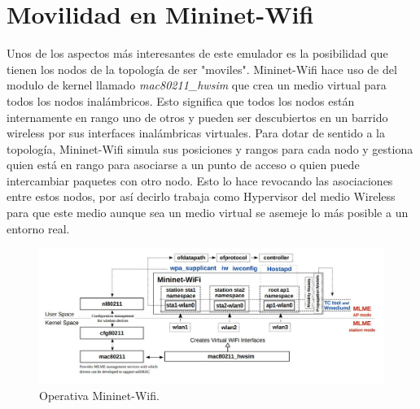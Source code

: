 \newpage
\section{Movilidad en Mininet-Wifi}
Unos de los aspectos más interesantes de este emulador es la posibilidad que tienen los nodos de la topología de ser "moviles". Mininet-Wifi hace uso de del modulo de kernel llamado \textit{mac80211\_hwsim} que crea un medio virtual para todos los nodos inalámbricos. Esto significa que todos los nodos están internamente en rango uno de otros y pueden ser descubiertos en un barrido wireless por sus interfaces inalámbricas virtuales. \newline
\newline
Para dotar de sentido a la topología, Mininet-Wifi simula sus posiciones y rangos para cada nodo y gestiona quien está en rango para asociarse a un punto de acceso o quien puede intercambiar paquetes con otro nodo. Esto lo hace revocando las asociaciones entre estos nodos, por así decirlo trabaja como Hypervisor del medio Wireless para que este medio aunque sea un medio virtual se asemeje lo más posible a un entorno real.
\begin{figure}[!htb]
  \centering
    \includegraphics[width=0.9\linewidth]{./img/movi/1.JPG}
    \caption{Operativa Mininet-Wifi.}
  \label{fig:yo}
\end{figure}
